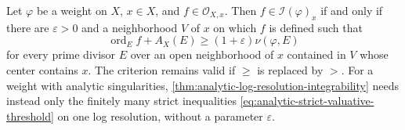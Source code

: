\begin{theorem}\label{thm:general-valuative-multiplier-criterion}
Let $\varphi$ be a weight on $X$, $x\in X$, and $f\in\mathcal O_{X,x}$. Then $f\in\mathcal I(\varphi)_x$ if and only if there are $\varepsilon>0$ and a neighborhood $V$ of $x$ on which $f$ is defined such that
\begin{equation}\label{eq:uniform-valuative-multiplier-criterion}
 \operatorname{ord}_E f+A_X(E)\geq(1+\varepsilon)\nu(\varphi,E)
\end{equation}
for every prime divisor $E$ over an open neighborhood of $x$ contained in $V$ whose center contains $x$. The criterion remains valid if $\geq$ is replaced by $>$. For a weight with analytic singularities, \cref{thm:analytic-log-resolution-integrability} needs instead only the finitely many strict inequalities \eqref{eq:analytic-strict-valuative-threshold} on one log resolution, without a parameter $\varepsilon$.
\end{theorem}
